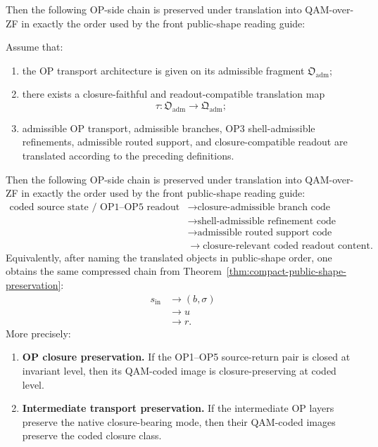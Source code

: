 Then the following OP-side chain is preserved under translation into QAM-over-ZF in exactly the order used by the front public-shape reading guide:
\begin{theorem}\label{thm:qam-translation}
Assume that:
\begin{enumerate}
\item the OP transport architecture is given on its admissible fragment $\mathfrak{O}_{\mathrm{adm}}$;
\item there exists a closure-faithful and readout-compatible translation map
\[
\tau:\mathfrak{O}_{\mathrm{adm}}\to \mathfrak{Q}_{\mathrm{adm}};
\]
\item admissible OP transport, admissible branches, OP3 shell-admissible refinements, admissible routed support, and closure-compatible readout are translated according to the preceding definitions.
\end{enumerate}
Then the following OP-side chain is preserved under translation into QAM-over-ZF in exactly the order used by the front public-shape reading guide:
\[
\begin{aligned}
\text{coded source state / OP1--OP5 readout face}
&\longrightarrow \text{closure-admissible branch code}\\
&\longrightarrow \text{shell-admissible refinement code}\\
&\longrightarrow \text{admissible routed support code}\\
&\longrightarrow \text{closure-relevant coded readout content}.
\end{aligned}
\]
Equivalently, after naming the translated objects in public-shape order, one obtains the same compressed chain from Theorem~\ref{thm:compact-public-shape-preservation}:
\[
\begin{aligned}
s_{\mathrm{in}}
&\longrightarrow (b,\sigma)\\
&\longrightarrow u\\
&\longrightarrow r.
\end{aligned}
\]
More precisely:

\begin{enumerate}
\item \textbf{OP closure preservation.}  
If the OP1--OP5 source-return pair is closed at invariant level, then its QAM-coded image is closure-preserving at coded level.

\item \textbf{Intermediate transport preservation.}  
If the intermediate OP layers preserve the native closure-bearing mode, then their QAM-coded images preserve the coded closure class.


\end{enumerate}
\end{theorem}
